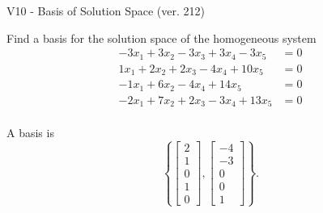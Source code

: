 \begin{exercise}
  \begin{exerciseTitle}V10 - Basis of Solution Space (ver. 212)\end{exerciseTitle}
  \begin{exerciseStatement}
    Find a basis for the solution space of the homogeneous system 
\begin{align*}
 -3 x_ 1 + 3 x_ 2 -3 x_ 3 + 3 x_ 4 -3 x_ 5 &= 0  \\ 
  1 x_ 1 + 2 x_ 2 + 2 x_ 3 -4 x_ 4 + 10 x_ 5 &= 0  \\ 
  -1 x_ 1 + 6 x_ 2 -4 x_ 4 + 14 x_ 5 &= 0  \\ 
  -2 x_ 1 + 7 x_ 2 + 2 x_ 3 -3 x_ 4 + 13 x_ 5 &= 0  \\ 
 \end{align*}


 
  \end{exerciseStatement}

  \begin{exerciseAnswer}
   A basis is   
\[\left\{\left[\begin{array}{c}
2 \\
1 \\
0 \\
1 \\
0
\end{array}\right] , \left[\begin{array}{c}
-4 \\
-3 \\
0 \\
0 \\
1
\end{array}\right]\right\}.\]

  


  \end{exerciseAnswer}
\end{exercise}